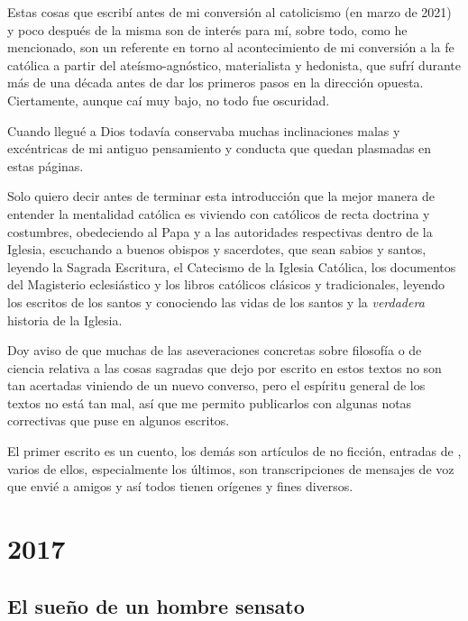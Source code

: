 \documentclass[12pt]{article}
\begin{document}
	Estas cosas que escribí antes de mi conversión al catolicismo (en marzo
	de 2021) y poco después de la misma son de interés
	 para mí, sobre todo, como he mencionado, son un
	referente en torno al acontecimiento de mi conversión a la fe católica a
	partir del ateísmo-agnóstico, materialista y hedonista, que sufrí
	durante más de una década antes de dar los primeros pasos en la
	dirección opuesta. Ciertamente, aunque caí muy bajo, no todo fue
	oscuridad.

	Cuando llegué a Dios todavía conservaba muchas inclinaciones malas y
	excéntricas de mi antiguo pensamiento y conducta que quedan plasmadas en
	estas páginas.

	Solo quiero decir antes de terminar esta introducción que la mejor
	manera de entender la mentalidad católica es viviendo con católicos de
	recta doctrina y costumbres, obedeciendo al Papa y a las autoridades
	respectivas dentro de la Iglesia, escuchando a buenos obispos y
	sacerdotes, que sean sabios y santos, leyendo la Sagrada Escritura, el
	Catecismo de la Iglesia Católica, los documentos del Magisterio
	eclesiástico y los libros católicos clásicos y tradicionales, leyendo 
	los escritos
	de los santos y conociendo las vidas de los santos y la
	\textit{verdadera} historia de la Iglesia.

	Doy aviso de que muchas de las aseveraciones concretas sobre filosofía o
	de ciencia relativa a las cosas sagradas que dejo por escrito en estos
	textos no son tan acertadas viniendo de un nuevo converso, pero el
	espíritu general de los textos no está tan mal, así que me permito
	publicarlos con algunas notas correctivas que puse en algunos
	escritos.\newline

	El primer escrito es un cuento, los demás son artículos de no ficción,
	entradas de , varios de ellos, especialmente los
	últimos, son transcripciones de mensajes de voz que envié a amigos y así
	todos tienen orígenes y fines diversos.

	\newpage

	\section{2017}

	\subsection{El sueño de un hombre sensato}
\end{document}
